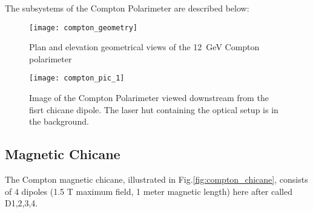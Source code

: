 {The subsystems of the Compton Polarimeter  are described below:

 \begin{figure}[htp]
    \begin{center}
        \texttt{[image: compton\_geometry]}
    \end{center}
    \caption[compton:Geometry  layout]{
            Plan and elevation geometrical views of the 12~GeV Compton polarimeter
            }
    \label{fig:compton_geometry}
 \end{figure}

 \begin{figure}[htp]
    \begin{center}
        \texttt{[image: compton\_pic\_1]}
    \end{center}
    \caption[compton:compton  pic]{
            Image of the Compton Polarimeter viewed downstream  from the fisrt chicane dipole. The laser hut containing the optical setup is in the  background.}
    \label{fig:compton_pic}
 \end{figure}

\subsection{Magnetic Chicane}
\label{sec:compton_chicane}

The Compton magnetic chicane, illustrated in Fig.\ref{fig:compton_chicane}, consists of 4 dipoles (1.5 T maximum field, 1 meter magnetic length) here after called D1,2,3,4.

}
